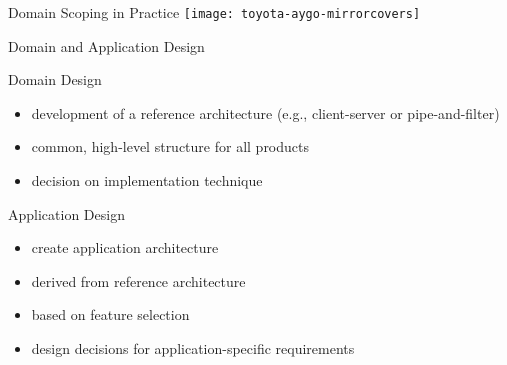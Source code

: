 
\begin{frame}{Domain Scoping in Practice}
	\centering\texttt{[image: toyota-aygo-mirrorcovers]}
\end{frame}

\begin{frame}{Domain and Application Design}
	\begin{mycolumns}[T,columns=3,widths={10}]
		\renewcommand{\projectcartoonwidth}{1}
	\mynextcolumn
		\begin{definition}{Domain Design} %
			\begin{itemize}
				\item development of a reference architecture (e.g., client-server or pipe-and-filter)
				\item common, high-level structure for all products
				\item decision on implementation technique
			\end{itemize}
		\end{definition}
	\mynextcolumn
		\begin{definition}{Application Design}
			\begin{itemize}
				\item create application architecture
				\item derived from reference architecture
				\item based on feature selection
				\item design decisions for application-specific requirements
			\end{itemize}
		\end{definition}
	\end{mycolumns}
\end{frame}


